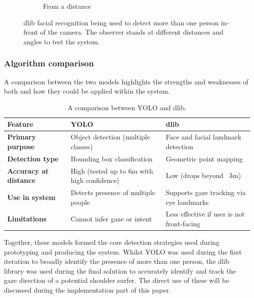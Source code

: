 \documentclass[12pt]{article}
\theoremstyle{plain}
\theoremstyle{definition}
\begin{document}
\begin{figure}
\begin{subfigure}[b]{0.3\textwidth}
         \caption{From a distance}
         \label{fig:face_c}
     \end{subfigure}
        \caption{dlib facial recognition being used to detect more than one person in-front of the camera. The observer stands at different distances and angles to test the system.}
        \label{fig:dlib}
\end{figure}

\subsubsection{Algorithm comparison}

A comparison between the two models highlights the strengths and weaknesses of both and how they could be applied within the system.

\begin{table}[h!]
    \begin{center}
        \begin{tabularx}{0.8\textwidth} { 
              | >{\centering\arraybackslash}X 
              | >{\centering\arraybackslash}X 
              | >{\centering\arraybackslash}X | }
            \hline
            \textbf{Feature} & \textbf{YOLO} & \textbf{dlib} \\ [0.5ex]
             \hline \hline
             \textbf{Primary purpose} & Object detection (multiple classes) & Face and facial landmark detection \\
              \hline
             \textbf{Detection type}  & Bounding box classification  & Geometric point mapping  \\
             \hline
             \textbf{Accuracy at distance}  & High (tested up to 6m with high confidence)  & Low (drops beyond ~3m)  \\
            \hline
            \textbf{Use in system} & Detects presence of multiple people & Supports gaze tracking via eye landmarks \\
            \hline
            \textbf{Limitations} & Cannot infer gaze or intent & Less effective if user is not front-facing \\ [1ex]
            \hline
        \end{tabularx}
    \end{center}
    \caption{A comparison between YOLO and dlib.}
    \label{table:1}
\end{table}

Together, these models formed the core detection strategies used during prototyping and producing the system. Whilst YOLO was used during the first iteration to broadly identify the presence of more than one person, the dlib library was used during the final solution to accurately identify and track the gaze direction of a potential shoulder surfer. The direct use of these will be discussed during the implementation part of this paper.
\end{document}
